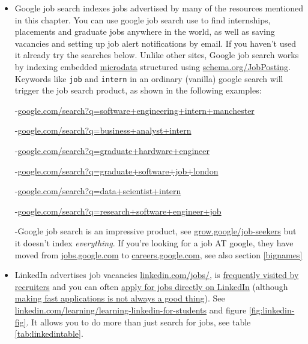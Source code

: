 \documentclass[
]{book}
\begin{document}
\begin{itemize}
\item
  Google job search indexes jobs advertised by many of the resources mentioned in this chapter. You can use google job search use to find internships, placements and graduate jobs anywhere in the world, as well as saving vacancies and setting up job alert notifications by email. If you haven't used it already try the searches below. Unlike other sites, Google job search works by indexing embedded \href{https://en.wikipedia.org/wiki/Microdata_(HTML)}{microdata} structured using \href{https://schema.org/JobPosting}{schema.org/JobPosting}. Keywords like \texttt{job} and \texttt{intern} in an ordinary (vanilla) google search will trigger the job search product, as shown in the following examples:

  -\href{https://www.google.com/search?q=software+engineering+intern+manchester}{google.com/search?q=software+engineering+intern+manchester}

  -\href{https://www.google.com/search?q=business+analyst+intern}{google.com/search?q=business+analyst+intern}

  -\href{https://www.google.com/search?q=graduate+hardware+engineer}{google.com/search?q=graduate+hardware+engineer}

  -\href{https://www.google.com/search?q=graduate+software+job+london}{google.com/search?q=graduate+software+job+london}

  -\href{https://www.google.com/search?q=data+scientist+intern}{google.com/search?q=data+scientist+intern}

  -\href{https://www.google.com/search?q=research+software+engineer+job}{google.com/search?q=research+software+engineer+job}

  -Google job search is an impressive product, see \href{https://grow.google/job-seekers}{grow.google/job-seekers} but it doesn't index \emph{everything}. If you're looking for a job AT google, they have moved from \href{https://jobs.google.com/about/}{jobs.google.com} to \href{https://careers.google.com/}{careers.google.com}, see also section \ref{bignames}
\item
  LinkedIn advertises job vacancies \href{https://www.linkedin.com/jobs/}{linkedin.com/jobs/}, is \href{https://blog.linkedin.com/2016/10/06/now-you-can-privately-signal-to-recruiters-youre-open-to-new-job}{frequently visited by recruiters} and you can often \href{https://www.linkedin.com/help/linkedin/answer/75815/applying-for-jobs-on-linkedin?lang=en}{apply for jobs directly on LinkedIn} (although \href{https://medium.com/otta-blog/job-boards-making-fast-applications-is-not-a-good-thing-5a4970887ecd}{making fast applications is not always a good thing}). See \href{https://www.linkedin.com/learning/learning-linkedin-for-students}{linkedin.com/learning/learning-linkedin-for-students} and figure \ref{fig:linkedin-fig}. It allows you to do more than just search for jobs, see table \ref{tab:linkedintable}.
\end{itemize}
\end{document}
